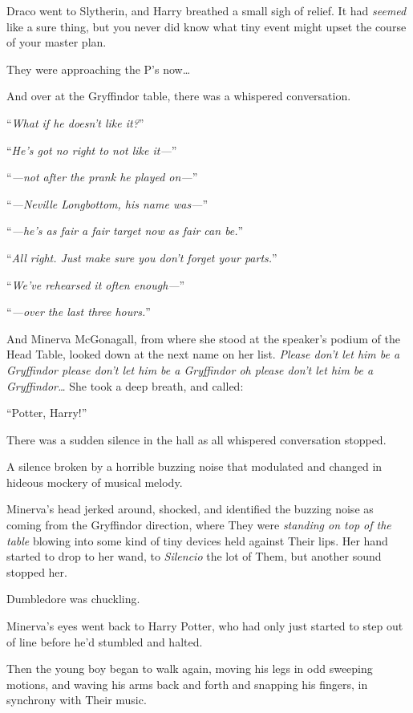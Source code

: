 \later

Draco went to Slytherin, and Harry breathed a small sigh of relief. It had \emph{seemed} like a sure thing, but you never did know what tiny event might upset the course of your master plan.

They were approaching the P’s now…

And over at the Gryffindor table, there was a whispered conversation.

“\emph{What if he doesn’t like it?}”

“\emph{He’s got no right to not like it—}”

“\emph{—not after the prank he played on—}”

“\emph{—Neville Longbottom, his name was—}”

“\emph{—he’s as fair a fair target now as fair can be.}”

“\emph{All right. Just make sure you don’t forget your parts.}”

“\emph{We’ve rehearsed it often enough—}”

“\emph{—over the last three hours.}”

And Minerva McGonagall, from where she stood at the speaker’s podium of the Head Table, looked down at the next name on her list. \emph{Please don’t let him be a Gryffindor please don’t let him be a Gryffindor \emph{oh please} don’t let him be a Gryffindor…} She took a deep breath, and called:

“Potter, Harry!”

There was a sudden silence in the hall as all whispered conversation stopped.

A silence broken by a horrible buzzing noise that modulated and changed in hideous mockery of musical melody.

Minerva’s head jerked around, shocked, and identified the buzzing noise as coming from the Gryffindor direction, where They were \emph{standing on top of the table} blowing into some kind of tiny devices held against Their lips. Her hand started to drop to her wand, to \emph{Silencio} the lot of Them, but another sound stopped her.

Dumbledore was chuckling.

Minerva’s eyes went back to Harry Potter, who had only just started to step out of line before he’d stumbled and halted.

Then the young boy began to walk again, moving his legs in odd sweeping motions, and waving his arms back and forth and snapping his fingers, in synchrony with Their music.

